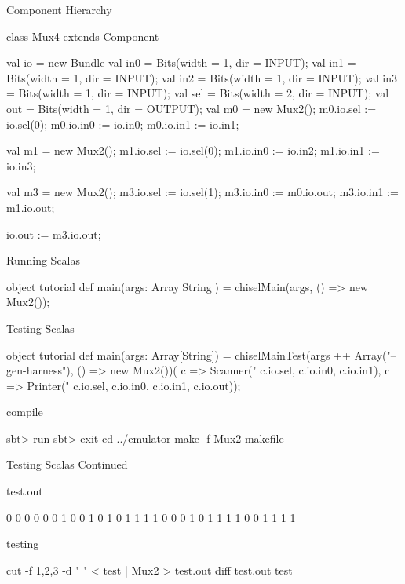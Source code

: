 \documentclass[xcolor=pdflatex,dvipsnames,table]{beamer}
\begin{document}
\begin{frame}{Component Hierarchy}
\begin{scala}
class Mux4 extends Component {
  val io = new Bundle {
    val in0 = Bits(width = 1, dir = INPUT);
    val in1 = Bits(width = 1, dir = INPUT);
    val in2 = Bits(width = 1, dir = INPUT);
    val in3 = Bits(width = 1, dir = INPUT);
    val sel = Bits(width = 2, dir = INPUT);
    val out = Bits(width = 1, dir = OUTPUT);
  }
  val m0 = new Mux2();
  m0.io.sel := io.sel(0); 
  m0.io.in0 := io.in0; m0.io.in1 := io.in1;

  val m1 = new Mux2();
  m1.io.sel := io.sel(0); 
  m1.io.in0 := io.in2; m1.io.in1 := io.in3;

  val m3 = new Mux2();
  m3.io.sel := io.sel(1); 
  m3.io.in0 := m0.io.out; m3.io.in1 := m1.io.out;

  io.out := m3.io.out;
}
\end{scala}
\end{frame}

\begin{frame}[fragile]{Running Scalas}
\begin{scala}
object tutorial {
  def main(args: Array[String]) = {
    chiselMain(args, () => new Mux2());
  }
}
\end{scala}
\end{frame}

\begin{frame}{Testing Scalas}

\begin{scala}
object tutorial {
  def main(args: Array[String]) = {
    chiselMainTest(args ++ Array("--gen-harness"), 
                   () => new Mux2())(
      c => Scanner("%
                   c.io.sel, c.io.in0, c.io.in1),
      c => Printer("%
                   c.io.sel, c.io.in0, c.io.in1, c.io.out));
  }
}
\end{scala}

compile

\begin{scala}
sbt> run
sbt> exit
cd ../emulator
make -f Mux2-makefile
\end{scala}

\end{frame}

\begin{frame}{Testing Scalas Continued}

test.out

\begin{scala}
0 0 0 0
0 0 1 0
0 1 0 1
0 1 1 1
1 0 0 0
1 0 1 1
1 1 0 0
1 1 1 1
\end{scala}

testing

\begin{scala}
cut -f 1,2,3 -d " " < test | Mux2 > test.out
diff test.out test
\end{scala}

\end{frame}
\end{document}
